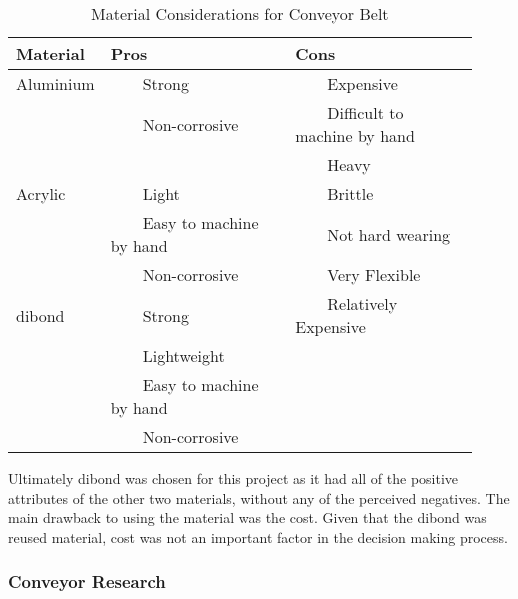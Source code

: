 \documentclass [11pt]{article}
\newcommand{\tabitem}{~~\llap{\textbullet}~~}
\begin{document}
\begin{table}[H]
\centering
\setlength{\arrayrulewidth}{1.5pt}
\begin{tabular}{|p{0.12\linewidth}|p{0.4\linewidth}|p{0.4\linewidth}|}
\hline
\cellcolor{gray!40} Material & \cellcolor{gray!40}Pros & \cellcolor{gray!40} Cons \\ 
\hline
\cellcolor{gray!20} Aluminium & \cellcolor{gray!20} \tabitem Strong & \cellcolor{gray!20} \tabitem Expensive\\
\cellcolor{gray!20} & \cellcolor{gray!20} \tabitem Non-corrosive & \cellcolor{gray!20}  \tabitem Difficult to machine by hand \\
\cellcolor{gray!20} & \cellcolor{gray!20}  & \cellcolor{gray!20}  \tabitem Heavy \\
\hline
\cellcolor{gray!20} Acrylic & \cellcolor{gray!20} \tabitem Light & \cellcolor{gray!20} \tabitem Brittle\\
\cellcolor{gray!20}  & \cellcolor{gray!20} \tabitem Easy to machine by hand & \cellcolor{gray!20} \tabitem Not hard wearing \\
\cellcolor{gray!20}  & \cellcolor{gray!20} \tabitem Non-corrosive & \cellcolor{gray!20} \tabitem Very Flexible\\
\hline
\cellcolor{gray!20} \gls{dibond} & \cellcolor{gray!20} \tabitem Strong & \cellcolor{gray!20} \tabitem Relatively Expensive \\
\cellcolor{gray!20}  & \cellcolor{gray!20} \tabitem Lightweight  & \cellcolor{gray!20} \\
\cellcolor{gray!20}  & \cellcolor{gray!20} \tabitem Easy to machine by hand & \cellcolor{gray!20} \\
\cellcolor{gray!20}  & \cellcolor{gray!20}  \tabitem Non-corrosive & \cellcolor{gray!20} \\
\hline
\end{tabular}
\caption{Material Considerations for Conveyor Belt}
\label{table:conveyor_materials}
\end{table} 

Ultimately \gls{dibond} was chosen for this project as it had all of the positive attributes of the other two materials, without any of the perceived negatives. The main drawback to using the material was the cost. Given that the \gls{dibond} was reused material, cost was not an important factor in the decision making process. 

\subsubsection{Conveyor Research}
\end{document}
